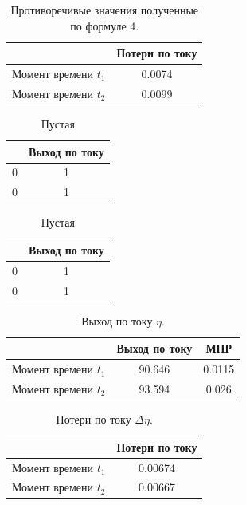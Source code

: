 \documentclass{article}
\begin{document}
\begin{table}[ht]
\centering
\begin{tabular}{|c|c|}
\hline
			&Потери по току	\\
\hline
Момент времени $t_1$		&0.0074\\ 
Момент времени $t_2$		&0.0099\\  
\hline
\end{tabular}
\caption{Противоречивые значения полученные по формуле 4.}
\end{table}

\begin{table}[ht]
\centering
\begin{tabular}{|c|c|}
\hline
			&Выход по току	\\
\hline
0		&1	\\ 
0		&1	\\  
\hline
\end{tabular}
\caption{Пустая}
\end{table}
\begin{table}[ht]
\centering
\begin{tabular}{|c|c|}
\hline
			&Выход по току	\\
\hline
0		&1	\\ 
0		&1	\\  
\hline
\end{tabular}
\caption{Пустая}
\end{table}

\begin{table}[ht]
\centering
\begin{tabular}{|c|c|c|}
\hline
			&Выход по току	& МПР\\
\hline
Момент времени $t_1$		&90.646	& 0.0115\\ 
Момент времени $t_2$		&93.594	& 0.026\\  
\hline
\end{tabular}
\caption{Выход по току $\eta$.}
\end{table}

\begin{table}[ht]
\centering
\begin{tabular}{|c|c|}
\hline
			&Потери по току	\\
\hline
Момент времени $t_1$		&0.00674\\ 
Момент времени $t_2$		&0.00667\\  
\hline
\end{tabular}
\caption{Потери по току $\Delta \eta$.}
\end{table}
\end{document}

